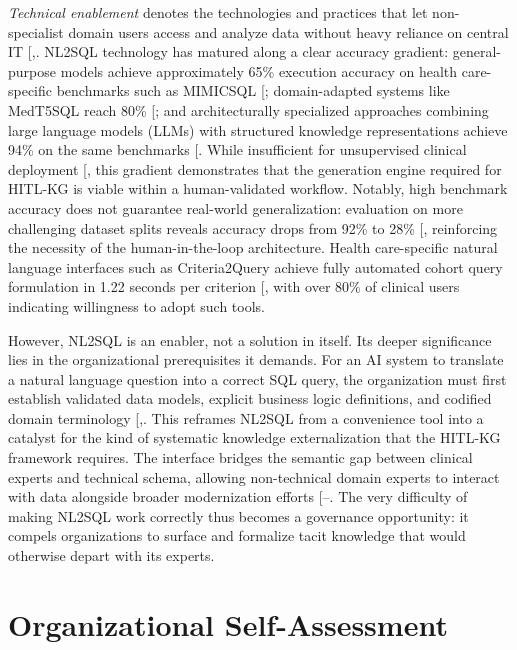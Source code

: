 \documentclass[
  american,
  11pt,
  letterpaper,
  oneside  ,captions=tableheading
]{scrartcl}
\begin{document}
\emph{Technical enablement} denotes the technologies and practices that
let non-specialist domain users access and analyze data without heavy
reliance on central IT
{[},\citeproc{ref-banihani2020}{55}{]}.
NL2SQL technology has matured along a clear accuracy gradient:
general-purpose models achieve approximately 65\% execution accuracy on
health care-specific benchmarks such as MIMICSQL
{[}\citeproc{ref-blaskovic2025}{56}{]}; domain-adapted systems like
MedT5SQL reach 80\% {[}\citeproc{ref-marshan2024}{57}{]}; and
architecturally specialized approaches combining large language models
(LLMs) with structured knowledge representations achieve 94\% on the
same benchmarks {[}\citeproc{ref-chen2026graph}{58}{]}. While
insufficient for unsupervised clinical deployment
{[}\citeproc{ref-ziletti2024}{38}{]}, this gradient demonstrates that
the generation engine required for HITL-KG is viable within a
human-validated workflow. Notably, high benchmark accuracy does not
guarantee real-world generalization: evaluation on more challenging
dataset splits reveals accuracy drops from 92\% to 28\%
{[}\citeproc{ref-tarbell2024}{59}{]}, reinforcing the necessity of the
human-in-the-loop architecture. Health care-specific natural language
interfaces such as Criteria2Query achieve fully automated cohort query
formulation in 1.22 seconds per criterion
{[}\citeproc{ref-yuan2019}{60}{]}, with over 80\% of clinical users
indicating willingness to adopt such tools.

However, NL2SQL is an enabler, not a solution in itself. Its deeper
significance lies in the organizational prerequisites it demands. For an
AI system to translate a natural language question into a correct SQL
query, the organization must first establish validated data models,
explicit business logic definitions, and codified domain terminology
{[},\citeproc{ref-zhang2024}{4}{]}. This
reframes NL2SQL from a convenience tool into a catalyst for the kind of
systematic knowledge externalization that the HITL-KG framework
requires. The interface bridges the semantic gap between clinical
experts and technical schema, allowing non-technical domain experts to
interact with data alongside broader modernization efforts
{[}--\citeproc{ref-arora2025}{64}{]}.
The very difficulty of making NL2SQL work correctly thus becomes a
governance opportunity: it compels organizations to surface and
formalize tacit knowledge that would otherwise depart with its experts.

\section{Organizational
Self-Assessment}\label{organizational-self-assessment}
\end{document}
